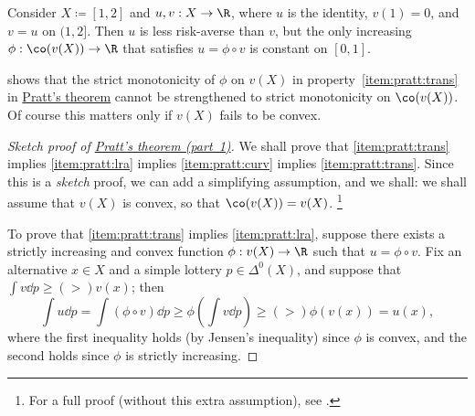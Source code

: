 \begin{example}
	\label{example:pratt_str}
	Consider $X \coloneqq [1,2]$ and $u,v : X \to \R$, where $u$ is the identity, $v(1)=0$, and $v=u$ on $(1,2]$. Then $u$ is less risk-averse than $v$, but the only increasing $\phi : \co(v(X)) \to \R$ that satisfies $u = \phi \circ v$ is constant on $[0,1]$.
\end{example}

 shows that the strict monotonicity of $\phi$ on $v(X)$ in property~\ref{item:pratt:trans} in \hyperref[theorem:pratt]{Pratt's theorem} cannot be strengthened to strict monotonicity on $\co(v(X))$. Of course this matters only if $v(X)$ fails to be convex.

\begin{proof}[Sketch proof of {\hyperref[theorem:pratt]{Pratt's theorem (part~1)}}]
	We shall prove that \ref{item:pratt:trans} implies \ref{item:pratt:lra} implies \ref{item:pratt:curv} implies \ref{item:pratt:trans}. Since this is a \emph{sketch} proof, we can add a simplifying assumption, and we shall: we shall assume that $v(X)$ is convex, so that $\co(v(X)) = v(X)$.%
		\footnote{For a full proof (without this extra assumption), see \textcite{oo}.}

	To prove that \ref{item:pratt:trans} implies \ref{item:pratt:lra}, suppose there exists a strictly increasing and convex function $\phi : v(X) \to \R$ such that $u = \phi \circ v$. Fix an alternative $x \in X$ and a simple lottery $p \in \Delta^0(X)$, and suppose that $\int v \dd p \geq \mathrel{(>)} v(x)$; then
	\begin{equation*}
		\int u \dd p
		= \int (\phi \circ v) \dd p
		\geq \phi\left( \int v \dd p \right)
		\geq \mathrel{(>)} \phi(v(x))
		= u(x) ,
	\end{equation*}
	where the first inequality holds (by Jensen's inequality) since $\phi$ is convex, and the second holds since $\phi$ is strictly increasing.


\end{proof}
